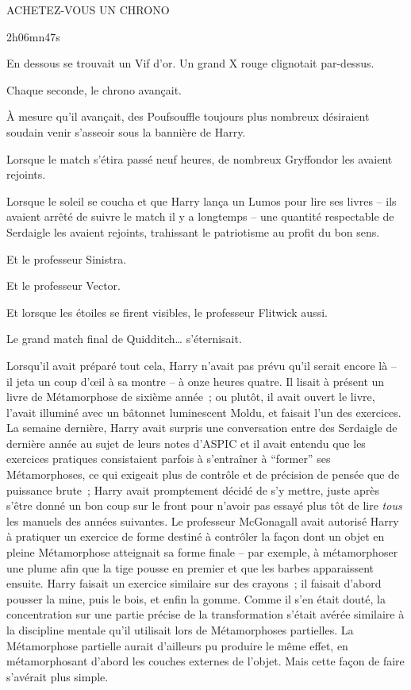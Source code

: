 \begin{center}
ACHETEZ-VOUS UN CHRONO

2h06mn47s
\end{center}

En dessous se trouvait un Vif d'or. Un grand X rouge clignotait par-dessus.

\later

Chaque seconde, le chrono avançait.

À mesure qu'il avançait, des Poufsouffle toujours plus nombreux désiraient soudain venir s'asseoir sous la bannière de Harry.

Lorsque le match s'étira passé neuf heures, de nombreux Gryffondor les avaient rejoints.

Lorsque le soleil se coucha et que Harry lança un Lumos pour lire ses livres -- ils avaient arrêté de suivre le match il y a longtemps -- une quantité respectable de Serdaigle les avaient rejoints, trahissant le patriotisme au profit du bon sens.

Et le professeur Sinistra.

Et le professeur Vector.

Et lorsque les étoiles se firent visibles, le professeur Flitwick aussi.

Le grand match final de Quidditch… s'éternisait.

\later

Lorsqu'il avait préparé tout cela, Harry n'avait pas prévu qu'il serait encore là -- il jeta un coup d'œil à sa montre -- à onze heures quatre. Il lisait à présent un livre de Métamorphose de sixième année~; ou plutôt, il avait ouvert le livre, l'avait illuminé avec un bâtonnet luminescent Moldu, et faisait l'un des exercices. La semaine dernière, Harry avait surpris une conversation entre des Serdaigle de dernière année au sujet de leurs notes d'ASPIC et il avait entendu que les exercices pratiques consistaient parfois à s'entraîner à “former” ses Métamorphoses, ce qui exigeait plus de contrôle et de précision de pensée que de puissance brute~; Harry avait promptement décidé de s'y mettre, juste après s'être donné un bon coup sur le front pour n'avoir pas essayé plus tôt de lire \emph{tous} les manuels des années suivantes. Le professeur McGonagall avait autorisé Harry à pratiquer un exercice de forme destiné à contrôler la façon dont un objet en pleine Métamorphose atteignait sa forme finale -- par exemple, à métamorphoser une plume afin que la tige pousse en premier et que les barbes apparaissent ensuite. Harry faisait un exercice similaire sur des crayons~; il faisait d'abord pousser la mine, puis le bois, et enfin la gomme. Comme il s'en était douté, la concentration sur une partie précise de la transformation s'était avérée similaire à la discipline mentale qu'il utilisait lors de Métamorphoses partielles. La Métamorphose partielle aurait d'ailleurs pu produire le même effet, en métamorphosant d'abord les couches externes de l'objet. Mais cette façon de faire s'avérait plus simple.

